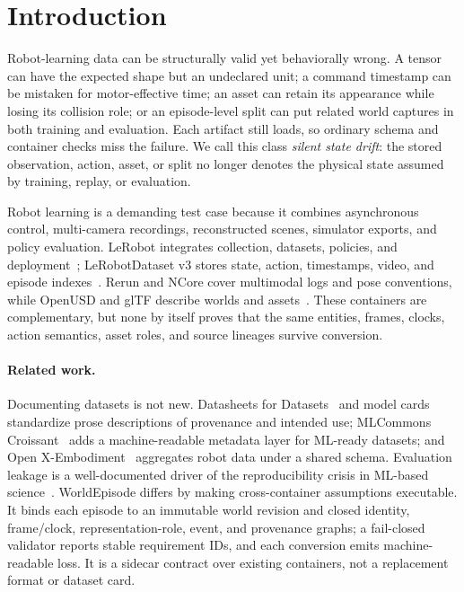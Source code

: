 \section{Introduction}
\label{sec:intro}

Robot-learning data can be structurally valid yet behaviorally wrong. A tensor can have the expected
shape but an undeclared unit; a command timestamp can be mistaken for motor-effective time; an asset
can retain its appearance while losing its collision role; or an episode-level split can put related
world captures in both training and evaluation. Each artifact still loads, so ordinary schema and
container checks miss the failure. We call this class \emph{silent state drift}: the stored
observation, action, asset, or split no longer denotes the physical state assumed by training,
replay, or evaluation.

Robot learning is a demanding test case because it combines asynchronous control, multi-camera
recordings, reconstructed scenes, simulator exports, and policy evaluation. LeRobot integrates
collection, datasets, policies, and deployment~\citep{lerobot}; LeRobotDataset v3 stores state,
action, timestamps, video, and episode indexes~\citep{lerobot_v3}. Rerun and NCore cover multimodal
logs and pose conventions, while OpenUSD and glTF describe worlds and assets~\citep{usd,ncore,gltf_gs}.
These containers are complementary, but none by itself proves that the same entities, frames,
clocks, action semantics, asset roles, and source lineages survive conversion.

\paragraph{Related work.}
Documenting datasets is not new. Datasheets for Datasets~\citep{gebru2021datasheets} and model
cards~\citep{mitchell2019modelcards} standardize prose descriptions of provenance and intended use; MLCommons
Croissant~\citep{croissant2024} adds a machine-readable metadata layer for ML-ready datasets; and
Open X-Embodiment~\citep{openx} aggregates robot data under a shared schema. Evaluation leakage is a
well-documented driver of the reproducibility crisis in ML-based science~\citep{kapoor2023leakage}.
WorldEpisode differs by making cross-container assumptions executable. It binds each episode to an
immutable world revision and closed identity, frame/clock, representation-role, event, and
provenance graphs; a fail-closed validator reports stable requirement IDs, and each conversion emits
machine-readable loss. It is a sidecar contract over existing containers, not a replacement format
or dataset card.

